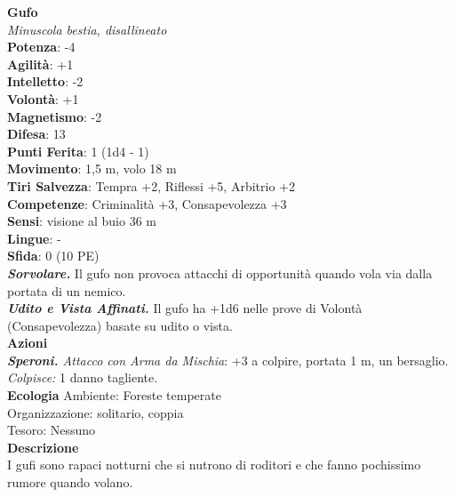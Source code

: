 \begin{multicols}{2}
\medskip\textbf{Gufo}\\
\emph{Minuscola bestia, disallineato}\\
\textbf{Potenza}: -4\\
\textbf{Agilità}: +1\\
\textbf{Intelletto}: -2\\
\textbf{Volontà}: +1\\
\textbf{Magnetismo}: -2\\
\textbf{Difesa}: 13\\
\textbf{Punti Ferita}: 1 (1d4 - 1)\\
\textbf{Movimento}: 1,5 m, volo 18 m\\
\textbf{Tiri Salvezza}: Tempra +2, Riflessi +5, Arbitrio +2 \\
\textbf{Competenze}: Criminalità +3, Consapevolezza +3\\
\textbf{Sensi}: visione al buio 36 m\\
\textbf{Lingue}: -\\
\textbf{Sfida}: 0 (10 PE)\smallskip\\
\emph{\textbf{Sorvolare.}} Il gufo non provoca attacchi di opportunità quando vola via dalla portata di un nemico.\\
\emph{\textbf{Udito e Vista Affinati.}} Il gufo ha +1d6 nelle prove di Volontà (Consapevolezza) basate su udito o vista.\\
\smallskip\textbf{Azioni}\\
\emph{\textbf{Speroni.} Attacco con Arma da Mischia}: +3 a colpire, portata 1 m, un bersaglio.\\
\emph{Colpisce:} 1 danno tagliente.\\
\textbf{Ecologia}
Ambiente: Foreste temperate\\
Organizzazione: solitario, coppia\\
Tesoro: Nessuno\\
\textbf{Descrizione}\\
I gufi sono rapaci notturni che si nutrono di roditori e che fanno pochissimo rumore quando volano. \\


\end{multicols}
